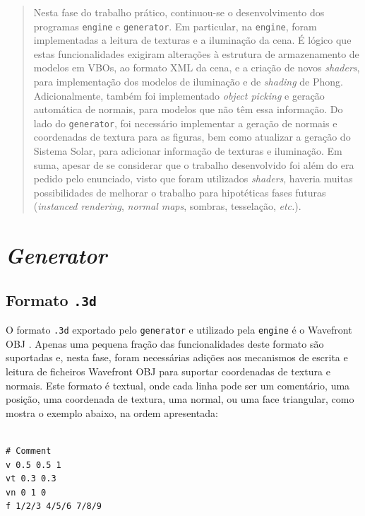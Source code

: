 \documentclass[12pt, a4paper]{article}
\begin{document}
\pagebreak

\begin{abstract}
    \noindent
    Nesta fase do trabalho prático, continuou-se o desenvolvimento dos programas \texttt{engine} e
    \texttt{generator}. Em particular, na \texttt{engine}, foram implementadas a leitura de texturas
    e a iluminação da cena. É lógico que estas funcionalidades exigiram alterações à estrutura de
    armazenamento de modelos em VBOs, ao formato XML da cena, e a criação de novos \emph{shaders},
    para implementação dos modelos de iluminação e de \emph{shading} de Phong. Adicionalmente,
    também foi implementado \emph{object picking} e geração automática de normais, para modelos que
    não têm essa informação. Do lado do \texttt{generator}, foi necessário implementar a geração de
    normais e coordenadas de textura para as figuras, bem como atualizar a geração do Sistema Solar,
    para adicionar informação de texturas e iluminação. Em suma, apesar de se considerar que o
    trabalho desenvolvido foi além do era pedido pelo enunciado, visto que foram utilizados
    \emph{shaders}, haveria muitas possibilidades de melhorar o trabalho para hipotéticas fases
    futuras (\emph{instanced rendering}, \emph{normal maps}, sombras, tesselação, \emph{etc.}).
\end{abstract}

\section{\emph{Generator}}

\subsection{Formato \texttt{.3d}}

O formato \texttt{.3d} exportado pelo \texttt{generator} e utilizado pela \texttt{engine} é o
Wavefront OBJ \cite{wavefront-obj}. Apenas uma pequena fração das funcionalidades deste formato
são suportadas e, nesta fase, foram necessárias adições aos mecanismos de escrita e leitura de
ficheiros Wavefront OBJ para suportar coordenadas de textura e normais. Este formato é textual, onde
cada linha pode ser um comentário, uma posição, uma coordenada de textura, uma normal, ou uma face
triangular, como mostra o exemplo abaixo, na ordem apresentada:

\begin{lstlisting}

# Comment
v 0.5 0.5 1
vt 0.3 0.3
vn 0 1 0
f 1/2/3 4/5/6 7/8/9
\end{lstlisting}
\end{document}
